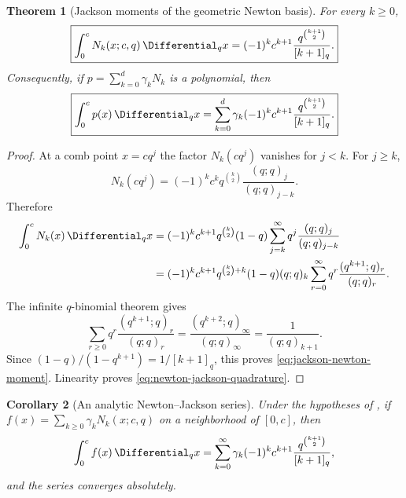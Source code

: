\documentclass[11pt,oneside]{book}
\numberwithin{equation}{chapter}
\newtheorem{theorem}{Theorem}[chapter]
\newtheorem{corollary}[theorem]{Corollary}
\theoremstyle{definition}
\theoremstyle{remark}
\begin{document}
\begin{theorem}[Jackson moments of the geometric Newton basis]
\label{thm:jackson-newton-moments}
For every $k\ge0$,
\begin{equation}
 \boxed{
 \int_0^c N_k(x;c,q)\,\Differential_qx
 =(-1)^k c^{k+1}
   \frac{q^{\binom{k+1}{2}}}{[k+1]_q}.}
 \label{eq:jackson-newton-moment}
\end{equation}
Consequently, if $p=\sum_{k=0}^d\gamma_kN_k$ is a polynomial, then
\begin{equation}
 \boxed{
 \int_0^c p(x)\,\Differential_qx
 =\sum_{k=0}^d\gamma_k(-1)^kc^{k+1}
   \frac{q^{\binom{k+1}{2}}}{[k+1]_q}.}
 \label{eq:newton-jackson-quadrature}
\end{equation}
\end{theorem}

\begin{proof}
At a comb point $x=cq^j$ the factor $N_k(cq^j)$ vanishes for $j<k$.
For $j\ge k$,
\begin{equation}
 N_k(cq^j)
 =(-1)^kc^kq^{\binom k2}
   \frac{(q;q)_j}{(q;q)_{j-k}}.
 \label{eq:newton-at-tail-node}
\end{equation}
Therefore
\begin{align*}
 \int_0^cN_k(x)\,\Differential_qx
 &=(-1)^kc^{k+1}q^{\binom k2}(1-q)
   \sum_{j=k}^{\infty}q^j\frac{(q;q)_j}{(q;q)_{j-k}}\\
 &=(-1)^kc^{k+1}q^{\binom k2+k}(1-q)(q;q)_k
   \sum_{r=0}^{\infty}q^r\frac{(q^{k+1};q)_r}{(q;q)_r}.
\end{align*}
The infinite $q$-binomial theorem gives
\[
 \sum_{r\ge0}q^r\frac{(q^{k+1};q)_r}{(q;q)_r}
 =\frac{(q^{k+2};q)_\infty}{(q;q)_\infty}
 =\frac1{(q;q)_{k+1}}.
\]
Since $(1-q)/(1-q^{k+1})=1/[k+1]_q$, this proves
\eqref{eq:jackson-newton-moment}.  Linearity proves
\eqref{eq:newton-jackson-quadrature}.
\end{proof}

\begin{corollary}[An analytic Newton--Jackson series]
\label{cor:analytic-newton-jackson}
Under the hypotheses of , if
$f(x)=\sum_{k\ge0}\gamma_kN_k(x;c,q)$ on a neighborhood of $[0,c]$, then
\begin{equation}
 \int_0^c f(x)\,\Differential_qx
 =\sum_{k=0}^{\infty}\gamma_k(-1)^kc^{k+1}
   \frac{q^{\binom{k+1}{2}}}{[k+1]_q},
 \label{eq:analytic-newton-jackson}
\end{equation}
and the series converges absolutely.
\end{corollary}
\end{document}
